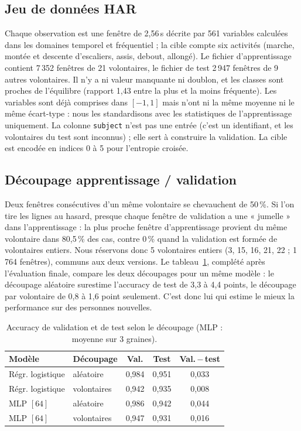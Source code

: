 \documentclass[10pt,a4paper]{article}
\begin{document}
\subsection{Jeu de données HAR}
Chaque observation est une fenêtre de 2,56\,s décrite par 561 variables calculées dans les domaines temporel et
fréquentiel ; la cible compte six activités (marche, montée et descente d'escaliers, assis, debout, allongé). Le
fichier d'apprentissage contient 7\,352 fenêtres de 21 volontaires, le fichier de test 2\,947 fenêtres de 9 autres
volontaires. Il n'y a ni valeur manquante ni doublon, et les classes sont proches de l'équilibre (rapport 1,43 entre la
plus et la moins fréquente). Les variables sont déjà comprises dans $[-1,1]$ mais n'ont ni la même moyenne ni le même
écart-type : nous les standardisons avec les statistiques de l'apprentissage uniquement. La colonne \texttt{subject}
n'est pas une entrée (c'est un identifiant, et les volontaires du test sont inconnus) ; elle sert à construire la
validation. La cible est encodée en indices 0 à 5 pour l'entropie croisée.

\subsection{Découpage apprentissage / validation}
Deux fenêtres consécutives d'un même volontaire se chevauchent de 50\,\%. Si l'on tire les lignes au hasard, presque
chaque fenêtre de validation a une « jumelle » dans l'apprentissage : la plus proche fenêtre d'apprentissage provient
du même volontaire dans 80,5\,\% des cas, contre 0\,\% quand la validation est formée de volontaires entiers. Nous
réservons donc 5 volontaires entiers (3, 15, 16, 21, 22 ; 1\,764 fenêtres), communs aux deux versions. Le
tableau~\ref{tab:split}, complété après l'évaluation finale, compare les deux découpages pour un même modèle : le
découpage aléatoire surestime l'accuracy de test de 3,3 à 4,4 points, le découpage par volontaire de 0,8 à 1,6 point
seulement. C'est donc lui qui estime le mieux la performance sur des personnes nouvelles.

\begin{table}[!htb]
\centering\footnotesize
\setlength{\tabcolsep}{3pt}
\caption{Accuracy de validation et de test selon le découpage (MLP : moyenne sur 3 graines).}
\label{tab:split}
\begin{tabular}{@{}llccc@{}}
\toprule
Modèle & Découpage & Val. & Test & Val.\,$-$\,test \\
\midrule
Régr. logistique & aléatoire & 0,984 & 0,951 & 0,033 \\
Régr. logistique & volontaires & 0,942 & 0,935 & 0,008 \\
MLP $[64]$ & aléatoire & 0,986 & 0,942 & 0,044 \\
MLP $[64]$ & volontaires & 0,947 & 0,931 & 0,016 \\
\bottomrule
\end{tabular}
\end{table}
\end{document}
